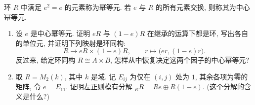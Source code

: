 \documentclass{article}
\begin{document}
\begin{problem}
环 $R$ 中满足 $e^2=e$ 的元素称为幂等元. 若 $e$ 与 $R$ 的所有元素交换, 则称其为中心幂等元.
\begin{enumerate}
  \item[(a)] 设 $e$ 是中心幂等元. 证明 $eR$ 与 $(1-e)R$ 在继承的运算下都是环, 写出各自的单位元, 并证明下列映射是环同构:
  \[
    R\longrightarrow eR\times(1-e)R,\qquad r\longmapsto\bigl(er,(1-e)r\bigr).
  \]
  反过来, 给定环同构 $R\cong A\times B$, 怎样从中恢复决定这两个因子的中心幂等元?
  \item[(b)] 取 $R=M_2(k)$, 其中 $k$ 是域. 记 $E_{ij}$ 为仅在 $(i,j)$ 处为 $1$, 其余各项为零的矩阵, 令 $e=E_{11}$. 证明左正则模有分解 ${}_R R=Re\oplus R(1-e)$. (这个分解的含义是什么?)
\end{enumerate}
\end{problem}
\end{document}
